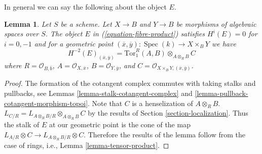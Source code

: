 \documentclass[10pt,a4paper]{article}
\theoremstyle{plain}
\newtheorem{lemma}[subsection]{Lemma}
\theoremstyle{definition}
\theoremstyle{remark}
\numberwithin{equation}{subsection}
\def\Spec{\mathop{\mathrm{Spec}}}
\begin{document}
\noindent
In general we can say the following about the object $E$.

\begin{lemma}
\label{lemma-fibre-product}
Let $S$ be a scheme. Let $X \to B$ and $Y \to B$ be morphisms of algebraic
spaces over $S$. The object $E$ in (\ref{equation-fibre-product}) satisfies
$H^i(E) = 0$ for $i = 0, -1$ and for a geometric point
$(\overline{x}, \overline{y}) : \Spec(k) \to X \times_B Y$ we have
$$
H^{-2}(E)_{(\overline{x}, \overline{y})} =
\text{Tor}_1^R(A, B) \otimes_{A \otimes_R B} C
$$
where $R = \mathcal{O}_{B, \overline{b}}$, $A = \mathcal{O}_{X, \overline{x}}$,
$B = \mathcal{O}_{Y, \overline{y}}$, and
$C = \mathcal{O}_{X \times_B Y, (\overline{x}, \overline{y})}$.
\end{lemma}

\begin{proof}
The formation of the cotangent complex commutes with taking stalks
and pullbacks, see
Lemmas \ref{lemma-stalk-cotangent-complex} and
\ref{lemma-pullback-cotangent-morphism-topoi}.
Note that $C$ is a henselization of $A \otimes_R B$.
$L_{C/R} = L_{A \otimes_R B/R} \otimes_{A \otimes_R B} C$
by the results of Section \ref{section-localization}.
Thus the stalk of $E$ at our geometric point is the cone of the
map $L_{A/R} \otimes C \to L_{A \otimes_R B/R} \otimes C$.
Therefore the results of the lemma follow from
the case of rings, i.e., Lemma \ref{lemma-tensor-product}.
\end{proof}





\end{document}
